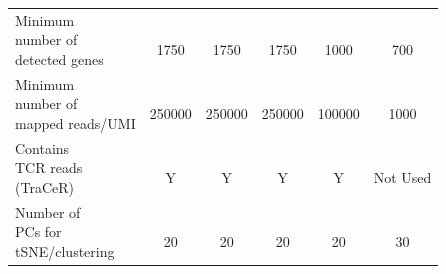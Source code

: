 \begin{table}[H]
\begin{tabular}{l|c c c c c}
\specialcell[t]{Minimum\\number of\\detected genes} & \specialcell[t]{ \\1750\\ } & \specialcell[t]{ \\1750\\ } & \specialcell[t]{ \\1750\\ } & \specialcell[t]{ \\1000\\ } & \specialcell[t]{ \\700\\ }\\

\specialcell[t]{Minimum\\number of\\mapped reads/UMI} & \specialcell[t]{ \\250000\\ } & \specialcell[t]{ \\250000\\ } & \specialcell[t]{ \\250000\\ } & \specialcell[t]{ \\100000\\ } & \specialcell[t]{ \\1000\\ }\\

\specialcell[t]{Contains\\TCR reads\\(TraCeR)} & \specialcell[t]{ \\Y\\ } & \specialcell[t]{ \\Y\\ } & \specialcell[t]{ \\Y\\ } & \specialcell[t]{ \\Y\\ } & \specialcell[t]{ \\Not Used\\ }\\

\specialcell[t]{Number of\\PCs for\\tSNE/clustering} & \specialcell[t]{ \\20\\ } & \specialcell[t]{ \\20\\ } & \specialcell[t]{ \\20\\ } & \specialcell[t]{ \\20\\ } & \specialcell[t]{ \\30\\ }\\


\end{tabular}
\end{table}
